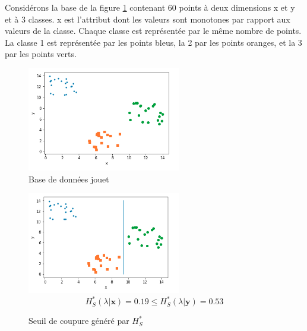 \documentclass[a4paper]{article}
\begin{document}
%    
%

Considérons la base de la figure \ref{img:artificial-dataset} contenant 60
points à deux dimensions x et y et à 3 classes. x est l'attribut dont les valeurs sont
monotones par rapport aux valeurs de la classe. Chaque classe est représentée
par le même nombre de points. La classe 1 est
représentée par les points bleus, la 2 par les points oranges, et la 3 par les
points verts. 

\begin{figure}[H]
	\center 
	\includegraphics[width=0.6\textwidth]{images/artificial-dataset.png}
    \caption{Base de données jouet}
    \label{img:artificial-dataset}
\end{figure}

\begin{figure}[H]
	\center 
	\includegraphics[width=0.6\textwidth]{images/threshold_rsdm.png}
    $$H^*_S(\lambda | \mathbf{x}) =  0.19 \leq H^*_S(\lambda | \mathbf{y}) =  0.53$$
    \caption{Seuil de coupure généré par $H^*_S$}
    \label{img:threshold_rsdm}
\end{figure}
\end{document}

